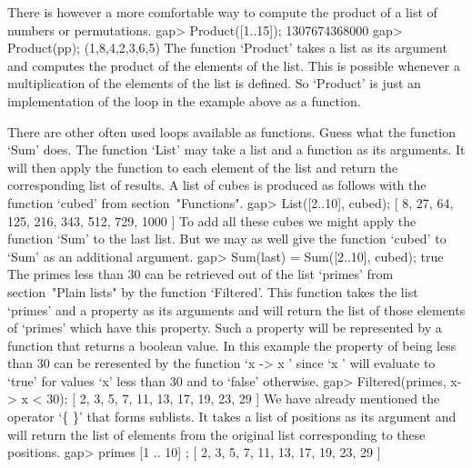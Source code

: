 
There is however a more comfortable way to  compute the product of a list
of numbers or permutations.
\beginexample
    gap> Product([1..15]);
    1307674368000
    gap> Product(pp);
    (1,8,4,2,3,6,5) 
\endexample
The function  `Product'  takes a  list as  its argument and computes  the
product  of  the  elements  of the  list.   This  is possible whenever  a
multiplication of  the elements of the list is defined.  So  `Product' is
just an implementation of the loop in the example above as a function.

There are other often used loops available as functions.   Guess what the
function `Sum' does.  The function `List' may  take a list and a function
as its arguments.  It will then apply the function to each element of the
list  and return  the corresponding list of results.   A list of cubes is
produced as follows with the function `cubed' from section~"Functions".
\beginexample
    gap> List([2..10], cubed);
    [ 8, 27, 64, 125, 216, 343, 512, 729, 1000 ] 
\endexample
To add all these cubes  we might apply the  function  `Sum' to  the  last
list.  But we may  as well  give the  function  `cubed' to  `Sum'  as  an
additional argument.
\beginexample
    gap> Sum(last) = Sum([2..10], cubed);
    true 
\endexample
The  primes less than 30 can  be retrieved out  of the list `primes' from
section~"Plain lists" by the function `Filtered'. This function takes the
list `primes' and a property as its arguments and will return the list of
those elements of `primes' which have this property. Such a property will
be represented  by  a function  that  returns  a boolean  value. In  this
example the property  of  being less than  30  can be reresented  by  the
function `x  -> x ' since `x ' will evaluate to `true'  for
values `x' less than 30 and to `false' otherwise.
\beginexample
    gap> Filtered(primes, x-> x < 30);
    [ 2, 3, 5, 7, 11, 13, 17, 19, 23, 29 ] 
\endexample
We have already  mentioned the operator `\{  \}' that  forms sublists. It
takes a  list of positions  as its argument  and will return  the list of
elements from the original list corresponding to these positions.
\beginexample
    gap> primes{ [1 .. 10] };
    [ 2, 3, 5, 7, 11, 13, 17, 19, 23, 29 ] 
\endexample


